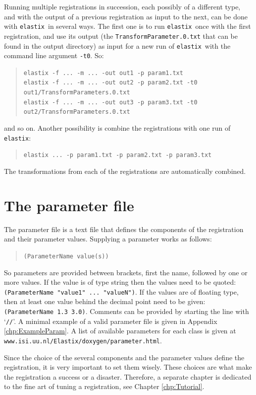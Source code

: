 \documentclass[]{report}
\newcommand{\elastix}{\texttt{elastix}}
\begin{document}
Running multiple registrations in succession, each possibly of a
different type, and with the output of a previous registration as
input to the next, can be done with \elastix\ in several ways. The
first one is to run \elastix\ once with the first registration, and
use its output (the \texttt{TransformParameter.0.txt} that can be
found in the output directory) as input for a new run of \elastix\
with the command line argument \texttt{-t0}. So:
\begin{quote}
\texttt{elastix -f ... -m ... -out out1 -p param1.txt} \\
\texttt{elastix -f ... -m ... -out out2 -p param2.txt -t0
out1/TransformParameters.0.txt} \\
\texttt{elastix -f ... -m ... -out out3 -p param3.txt -t0
out2/TransformParameters.0.txt}
\end{quote}
and so on. Another possibility is combine the registrations with one
run of \elastix:
\begin{quote}
\texttt{elastix ... -p param1.txt -p param2.txt -p param3.txt}
\end{quote}
The transformations from each of the registrations are automatically
combined.

\section{The parameter file}\label{sec:elastix:param}

The parameter file is a text file that defines the components of the
registration and their parameter values. Supplying a parameter works
as follows:
\begin{quote}
\texttt{(ParameterName value(s))}
\end{quote}
So parameters are provided between brackets, first the name, followed
by one or more values. If the value is of type string then the values
need to be quoted: \texttt{(ParameterName "value1" ... "valueN")}. If
the values are of floating type, then at least one value behind the
decimal point need to be given: \texttt{(ParameterName 1.3 3.0)}.
Comments can be provided by starting the line with `\texttt{//}'. A
minimal example of a valid parameter file is given in Appendix
\ref{chp:ExampleParam}. A list of available parameters for each class
is given at \texttt{www.isi.uu.nl/Elastix/doxygen/parameter.html}.

Since the choice of the several components and the parameter values
define the registration, it is very important to set them wisely.
These choices are what make the registration a success or a disaster.
Therefore, a separate chapter is dedicated to the fine art of tuning
a registration, see Chapter \ref{chp:Tutorial}.
\end{document}
